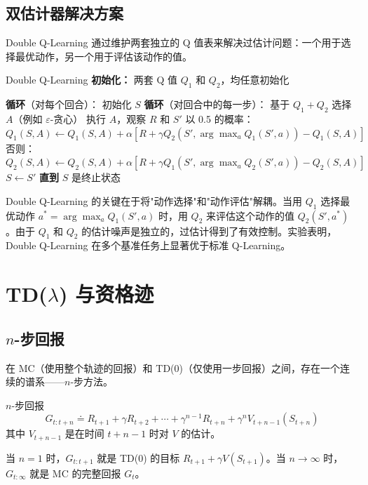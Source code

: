 \subsection{双估计器解决方案}

Double Q-Learning 通过维护两套独立的 Q 值表来解决过估计问题：一个用于选择最优动作，另一个用于评估该动作的值。

\begin{myalgorithm}{Double Q-Learning}
\textbf{初始化：} 两套 Q 值 $Q_1$ 和 $Q_2$，均任意初始化

\textbf{循环}（对每个回合）：
\quad 初始化 $S$
\quad \textbf{循环}（对回合中的每一步）：
\quad \quad 基于 $Q_1 + Q_2$ 选择 $A$（例如 $\varepsilon$-贪心）
\quad \quad 执行 $A$，观察 $R$ 和 $S'$
\quad \quad 以 0.5 的概率：
\quad \quad \quad $Q_1(S,A) \leftarrow Q_1(S,A) + \alpha[R + \gamma Q_2(S', \arg\max_a Q_1(S',a)) - Q_1(S,A)]$
\quad \quad 否则：
\quad \quad \quad $Q_2(S,A) \leftarrow Q_2(S,A) + \alpha[R + \gamma Q_1(S', \arg\max_a Q_2(S',a)) - Q_2(S,A)]$
\quad \quad $S \leftarrow S'$
\quad \textbf{直到} $S$ 是终止状态
\end{myalgorithm}

\begin{remark}
Double Q-Learning 的关键在于将"动作选择"和"动作评估"解耦。当用 $Q_1$ 选择最优动作 $a^* = \arg\max_a Q_1(S',a)$ 时，用 $Q_2$ 来评估这个动作的值 $Q_2(S', a^*)$。由于 $Q_1$ 和 $Q_2$ 的估计噪声是独立的，过估计得到了有效控制。实验表明，Double Q-Learning 在多个基准任务上显著优于标准 Q-Learning。
\end{remark}

\section{TD($\lambda$) 与资格迹}

\subsection{$n$-步回报}

在 MC（使用整个轨迹的回报）和 TD(0)（仅使用一步回报）之间，存在一个连续的谱系——$n$-步方法。

\begin{mydefinition}{$n$-步回报}
$$G_{t:t+n} \doteq R_{t+1} + \gamma R_{t+2} + \cdots + \gamma^{n-1} R_{t+n} + \gamma^n V_{t+n-1}(S_{t+n})$$
其中 $V_{t+n-1}$ 是在时间 $t+n-1$ 时对 $V$ 的估计。
\end{mydefinition}

当 $n=1$ 时，$G_{t:t+1}$ 就是 TD(0) 的目标 $R_{t+1} + \gamma V(S_{t+1})$。当 $n \to \infty$ 时，$G_{t:\infty}$ 就是 MC 的完整回报 $G_t$。

